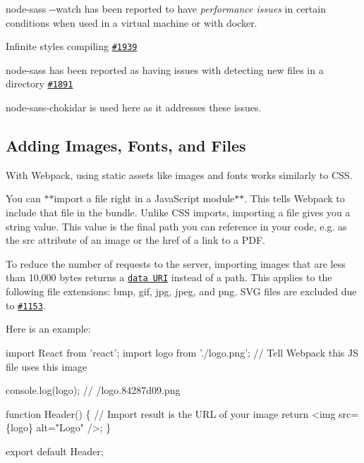 \begin{DoxyItemize}
\item {\ttfamily node-\/sass -\/-\/watch} has been reported to have {\itshape performance issues} in certain conditions when used in a virtual machine or with docker.
\item Infinite styles compiling \href{https://github.com/facebookincubator/create-react-app/issues/1939}{\tt \#1939}
\item {\ttfamily node-\/sass} has been reported as having issues with detecting new files in a directory \href{https://github.com/sass/node-sass/issues/1891}{\tt \#1891}

{\ttfamily node-\/sass-\/chokidar} is used here as it addresses these issues.
\end{DoxyItemize}

\subsection*{Adding Images, Fonts, and Files}

With Webpack, using static assets like images and fonts works similarly to C\+SS.

You can $\ast$$\ast${\ttfamily import} a file right in a Java\+Script module$\ast$$\ast$. This tells Webpack to include that file in the bundle. Unlike C\+SS imports, importing a file gives you a string value. This value is the final path you can reference in your code, e.\+g. as the {\ttfamily src} attribute of an image or the {\ttfamily href} of a link to a P\+DF.

To reduce the number of requests to the server, importing images that are less than 10,000 bytes returns a \href{https://developer.mozilla.org/en-US/docs/Web/HTTP/Basics_of_HTTP/Data_URIs}{\tt data U\+RI} instead of a path. This applies to the following file extensions\+: bmp, gif, jpg, jpeg, and png. S\+VG files are excluded due to \href{https://github.com/facebookincubator/create-react-app/issues/1153}{\tt \#1153}.

Here is an example\+:


\begin{DoxyCode}
import React from 'react';
import logo from './logo.png'; // Tell Webpack this JS file uses this image

console.log(logo); // /logo.84287d09.png

function Header() \{
  // Import result is the URL of your image
  return <img src=\{logo\} alt="Logo" />;
\}

export default Header;
\end{DoxyCode}


